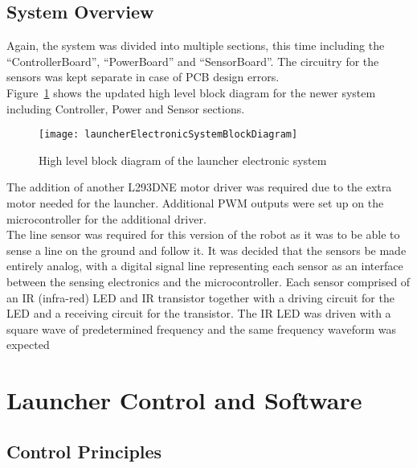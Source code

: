   \subsection{System Overview}
  \label{sub:System Overview}
    Again, the system was divided into multiple sections, this time including the ``ControllerBoard'', ``PowerBoard'' and ``SensorBoard''. The circuitry for the sensors was kept separate in case of PCB design errors.\\

    Figure~\ref{fig:launcherElectronicSystemBlockDiagram} shows the updated high level block diagram for the newer system including Controller, Power and Sensor sections.

    \begin{figure}[H]
      \begin{center}
        \texttt{[image: launcherElectronicSystemBlockDiagram]}
        \caption{High level block diagram of the launcher electronic system}
        \label{fig:launcherElectronicSystemBlockDiagram}
      \end{center}
    \end{figure}

    The addition of another L293DNE motor driver was required due to the extra motor needed for the launcher. Additional PWM outputs were set up on the microcontroller for the additional driver.\\

    The line sensor was required for this version of the robot as it was to be able to sense a line on the ground and follow it. It was decided that the sensors be made entirely analog, with a digital signal line representing each sensor as an interface between the sensing electronics and the microcontroller. Each sensor comprised of an IR (infra-red) LED and IR transistor together with a driving circuit for the LED and a receiving circuit for the transistor. The IR LED was driven with a square wave of predetermined frequency and the same frequency waveform was expected 


\clearpage
\section{Launcher Control and Software}
\label{sec:Launcher Control and Software}
  \subsection{Control Principles}
  \label{sub:Control Principles}
